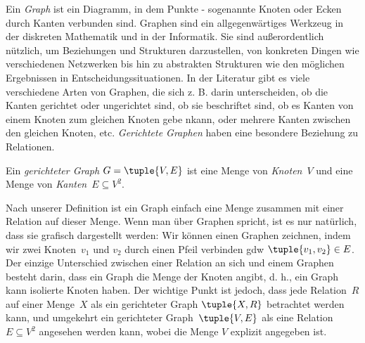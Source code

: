 \documentclass[../../../include/open-logic-section]{subfiles}
\begin{document}

Ein \emph{Graph} ist ein Diagramm, in dem Punkte - sogenannte \glqq Knoten\grqq{} oder
\glqq Ecken\grqq{} durch Kanten verbunden sind.  Graphen
sind ein allgegenwärtiges Werkzeug in der diskreten Mathematik und in der Informatik.
Sie sind außerordentlich nützlich, um Beziehungen und Strukturen darzustellen,
von konkreten Dingen wie verschiedenen Netzwerken bis hin zu abstrakten Strukturen wie den möglichen Ergebnissen in
Entscheidungssituationen.  In der Literatur gibt es viele verschiedene Arten von Graphen,
die sich z. B. darin unterscheiden, ob die Kanten gerichtet oder ungerichtet sind,
ob sie beschriftet sind, ob es Kanten von einem Knoten zum
gleichen Knoten gebe nkann, oder mehrere Kanten zwischen den gleichen Knoten, etc.
\emph{Gerichtete Graphen} haben eine besondere Beziehung zu Relationen.

\begin{defn}
Ein \emph{gerichteter Graph} $G = \tuple{V, E}$ ist eine Menge von
\emph{Knoten}~$V$ und eine Menge von \emph{Kanten}~$E \subseteq V^2$.
\end{defn}

\begin{explain}
Nach unserer Definition ist ein Graph einfach eine Menge zusammen mit einer
Relation auf dieser Menge.  Wenn man über Graphen spricht, ist es nur
natürlich, dass sie grafisch dargestellt werden: Wir können einen
Graphen zeichnen, indem wir zwei Knoten~$v_1$ und $v_2$ durch einen Pfeil verbinden
gdw $\tuple{v_1, v_2} \in E$.  Der einzige Unterschied zwischen einer Relation an sich
und einem Graphen besteht darin, dass ein Graph die Menge der Knoten angibt,
d. h., ein Graph kann isolierte Knoten haben. Der wichtige Punkt
ist jedoch, dass jede Relation~$R$ auf einer Menge~$X$ als ein
gerichteter Graph $\tuple{X, R}$ betrachtet werden kann, und umgekehrt ein gerichteter
Graph~$\tuple{V, E}$ als eine Relation $E \subseteq V^2$ angesehen werden kann, wobei
die Menge $V$ explizit angegeben ist.
\end{explain}
\end{document}
